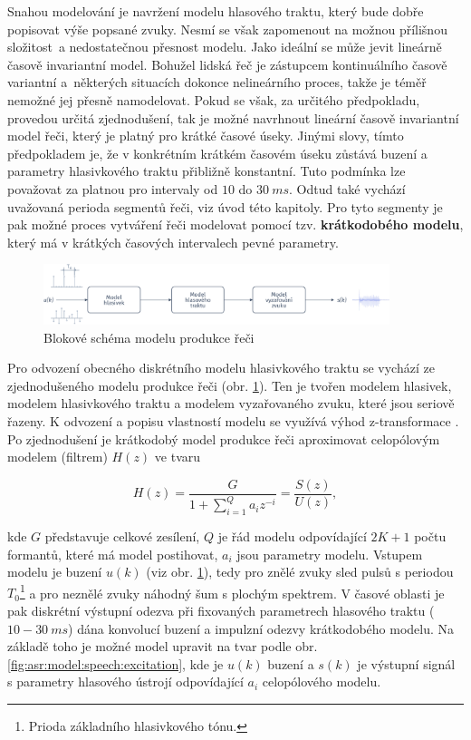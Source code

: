 Snahou modelování je navržení modelu hlasového traktu, který bude dobře popisovat výše popsané zvuky. Nesmí se však zapomenout na možnou přílišnou složitost~a nedostatečnou přesnost modelu. Jako ideální se může jevit lineárně časově invariantní model. Bohužel lidská řeč je zástupcem kontinuálního časově variantní a~některých situacích dokonce nelineárního proces, takže je téměř nemožné jej přesně namodelovat. Pokud se však, za určitého předpokladu, provedou určitá zjednodušení, tak je možné navrhnout lineární časově invariantní model řeči, který je platný pro krátké časové úseky. Jinými slovy, tímto předpokladem je, že v konkrétním krátkém časovém úseku zůstává buzení a parametry hlasivkového traktu přibližně konstantní. Tuto podmínka lze považovat za platnou pro intervaly od $10$ do $30\ ms$. Odtud také vychází uvažovaná perioda segmentů řeči, viz úvod této kapitoly. Pro tyto segmenty je pak možné proces vytváření řeči modelovat pomocí tzv. \textbf{krátkodobého modelu}, který má v krátkých časových intervalech pevné parametry. \cite{Holmes2001}

\begin{figure}[hbpt]
  \centering
  \includegraphics[width=0.9\textwidth]{./ch4-asr/img/speech_model.pdf}
  \caption{Blokové schéma modelu produkce řeči}
  \label{fig:asr:model:speech}
\end{figure}

Pro odvození obecného diskrétního modelu hlasivkového traktu se vychází ze zjednodušeného modelu produkce řeči (obr. \ref{fig:asr:model:speech}). Ten je tvořen modelem hlasivek, modelem hlasivkového traktu a modelem vyzařovaného zvuku, které jsou seriově řazeny. K odvození a popisu vlastností modelu se využívá výhod z-transformace \cite{Psutka2006}. Po zjednodušení je krátkodobý model produkce řeči aproximovat celopólovým modelem (filtrem) $H(z)$ ve tvaru

\begin{equation}
  H(z) = \frac{G}{1 + \sum_{i = 1}^{Q} a_{i} z^{-i}} = \frac{S(z)}{U(z)},
  \label{eq:asr:lpc:generic}
\end{equation}

\noindent kde $G$ představuje celkové zesílení, $Q$ je řád modelu odpovídající $2K + 1$ počtu formantů, které má model postihovat, $a_i$ jsou parametry modelu. Vstupem modelu je buzení $u(k)$ (viz obr. \ref{fig:asr:model:speech}), tedy pro znělé zvuky sled pulsů s periodou $T_0$\footnote{Prioda základního hlasivkového tónu.} a pro neznělé zvuky náhodný šum s plochým spektrem. V časové oblasti je pak diskrétní výstupní odezva při fixovaných parametrech hlasového traktu ($10 - 30\ ms$) dána konvolucí buzení a impulzní odezvy krátkodobého modelu. Na základě toho je možné model upravit na tvar podle obr. \ref{fig:asr:model:speech:excitation}, kde je $u(k)$ buzení a $s(k)$ je výstupní signál s parametry hlasového ústrojí odpovídající $a_i$ celopólového modelu.

